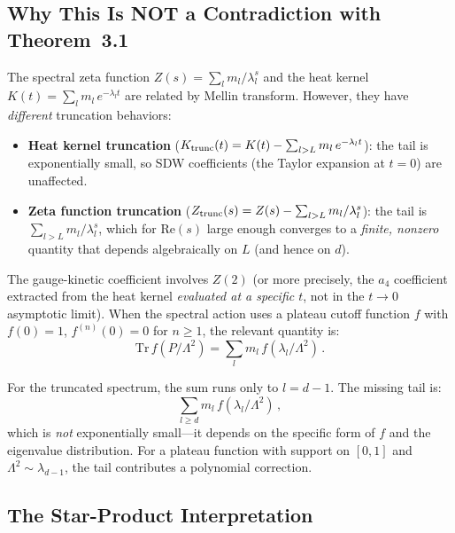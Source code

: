 \documentclass[12pt,a4paper]{article}
\theoremstyle{definition}
\begin{document}
\subsection{Why This Is NOT a Contradiction with Theorem~3.1}

The spectral zeta function $Z(s) = \sum_{l} m_l/\lambda_l^s$ and the
heat kernel $K(t) = \sum_l m_l\,e^{-\lambda_l t}$ are related by Mellin
transform.  However, they have \emph{different} truncation behaviors:

\begin{itemize}
\item \textbf{Heat kernel truncation}
  ($K_{\rm trunc}(t) = K(t) - \sum_{l>L} m_l\,e^{-\lambda_l t}$):
  the tail is exponentially small, so SDW coefficients (the Taylor
  expansion at $t = 0$) are unaffected.

\item \textbf{Zeta function truncation}
  ($Z_{\rm trunc}(s) = Z(s) - \sum_{l>L} m_l/\lambda_l^s$):
  the tail is $\sum_{l>L} m_l/\lambda_l^s$, which for $\mathrm{Re}(s)$
  large enough converges to a \emph{finite, nonzero} quantity that
  depends algebraically on $L$ (and hence on $d$).
\end{itemize}

The gauge-kinetic coefficient involves $Z(2)$ (or more precisely, the
$a_4$ coefficient extracted from the heat kernel \emph{evaluated at a
specific $t$}, not in the $t \to 0$ asymptotic limit).  When the spectral
action uses a plateau cutoff function $f$ with $f(0) = 1$,
$f^{(n)}(0) = 0$ for $n \geq 1$, the relevant quantity is:
\begin{equation}
\mathrm{Tr}\,f(P/\Lambda^2) = \sum_l m_l\,f(\lambda_l/\Lambda^2)\,.
\end{equation}

For the truncated spectrum, the sum runs only to $l = d-1$.  The missing
tail is:
\begin{equation}
\sum_{l \geq d} m_l\,f(\lambda_l/\Lambda^2)\,,
\end{equation}
which is \emph{not} exponentially small---it depends on the specific
form of $f$ and the eigenvalue distribution.  For a plateau function
with support on $[0, 1]$ and $\Lambda^2 \sim \lambda_{d-1}$, the
tail contributes a polynomial correction.

\subsection{The Star-Product Interpretation}
\end{document}
